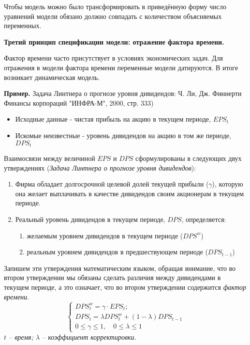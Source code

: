 \documentclass[12pt,a4paper]{article}
\begin{document}
Чтобы модель можно было трансформировать в приведённую форму число уравнений модели обязано должно совпадать с количеством объясняемых переменных.

\textbf{Третий принцип спецификации модели: отражение фактора времени.}

Фактор времени часто присутствует в условиях экономических задач. Для отражения в модели фактора времени переменные модели датируются. В итоге возникает динамическая модель.

\textbf{Пример.} Задача Линтнера о прогнозе уровня дивидендов: Ч. Ли, Дж. Финнерти Финансы корпораций "ИНФРА-М", 2000, стр. 333)
\begin{itemize}
\item Исходные данные - чистая прибыль на акцию в текущем периоде, $EPS_t$
\item Искомые неизвестные - уровень дивидендов на акцию в том же периоде, $DPS_t$
\end{itemize}

Взаимосвязи между величиной $EPS$ и $DPS$ сформулированы в следующих двух утверждениях (\textit{Задача Линтнера о прогнозе уровня дивидендов}):
\begin{enumerate}
\item Фирма обладает долгосрочной целевой долей текущей прибыли ($\gamma$), которую она желает выплачивать в качестве дивидендов своим акционерам в текущем периоде.
\item Реальный уровень дивидендов в текущем периоде, $DPS$, определяется:
	\begin{enumerate}
	\item желаемым уровнем дивидендов в текущем периоде ($DPS^w$)
	\item реальным уровнем дивидендов в предшествующем периоде ($DPS_{t-1}$)
	\end{enumerate}
\end{enumerate}

Запишем эти утверждения математическим языком, обращая внимание, что во втором утверждении мы обязаны сделать различия между дивидендами в текущем периоде, а это означает, что во втором утверждении содержится \textit{фактор времени}. 
\begin{equation}
\begin{cases}
DPS_t^w = \gamma \cdot EPS_t; \\
DPS_t = \lambda DPS_t^w + (1 - \lambda) DPS_{t-1} \\
0 \leqslant \gamma \leqslant 1, \quad 0 \leqslant \lambda \leqslant 1
\end{cases}
\end{equation}
\textit{$t$ -- время; $\lambda$ -- коэффициент корректировки.}
\end{document}
